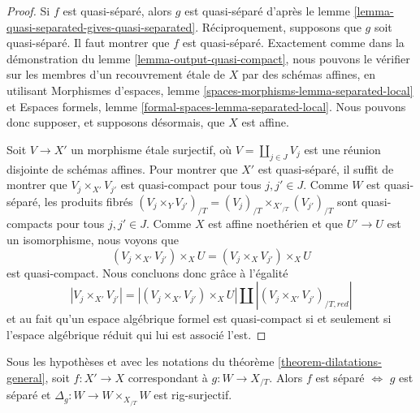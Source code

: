 \begin{proof}
Si $f$ est quasi-séparé, alors $g$ est quasi-séparé d'après le
lemme \ref{lemma-quasi-separated-gives-quasi-separated}.
Réciproquement, supposons que $g$ soit quasi-séparé. Il faut montrer
que $f$ est quasi-séparé. Exactement comme dans la démonstration du
lemme \ref{lemma-output-quasi-compact}, nous pouvons le vérifier
sur les membres d'un recouvrement étale de $X$ par des schémas affines,
en utilisant Morphismes d'espaces, lemme
\ref{spaces-morphisms-lemma-separated-local}
et Espaces formels, lemme
\ref{formal-spaces-lemma-separated-local}.
Nous pouvons donc supposer, et supposons désormais, que $X$ est affine.

\medskip\noindent
Soit $V \to X'$ un morphisme étale surjectif, où
$V = \coprod_{j \in J} V_j$ est une réunion disjointe de schémas affines.
Pour montrer que $X'$ est quasi-séparé, il suffit de montrer que
$V_j \times_{X'} V_{j'}$ est quasi-compact pour tous $j, j' \in J$.
Comme $W$ est quasi-séparé, les produits fibrés
$(V_j \times_Y V_{j'})_{/T} = (V_j)_{/T} \times_{X'_{/T}} (V_{j'})_{/T}$
sont quasi-compacts pour tous $j, j' \in J$. Comme $X$ est affine
noethérien et que $U' \to U$ est un isomorphisme, nous voyons que
$$
(V_j \times_{X'} V_{j'}) \times_X U =
(V_j \times_X V_{j'}) \times_X U
$$
est quasi-compact. Nous concluons donc grâce à l'égalité
$$
|V_j \times_{X'} V_{j'}| =
|(V_j \times_{X'} V_{j'}) \times_X U| \amalg
|(V_j \times_{X'} V_{j'})_{/T, red}|
$$
et au fait qu'un espace algébrique formel est quasi-compact si et seulement
si l'espace algébrique réduit qui lui est associé l'est.
\end{proof}

\begin{lemma}
\label{lemma-output-separated}
Sous les hypothèses et avec les notations du
théorème \ref{theorem-dilatations-general}, soit $f : X' \to X$
correspondant à $g : W \to X_{/T}$.
Alors $f$ est séparé $\Leftrightarrow$ $g$ est séparé et
$\Delta_g : W \to W \times_{X_{/T}} W$ est rig-surjectif.
\end{lemma}

